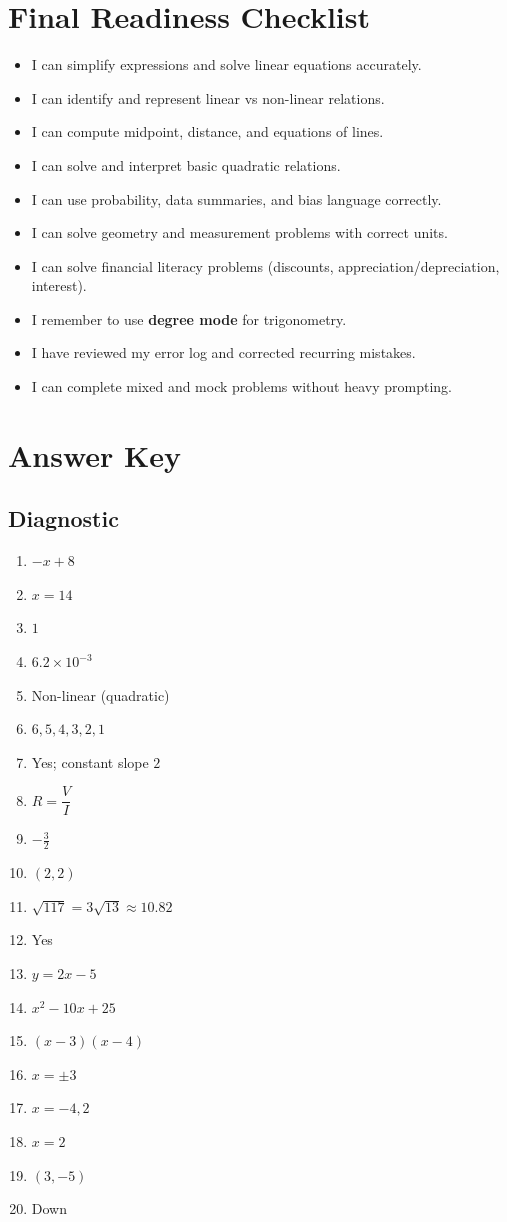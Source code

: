 \documentclass[12pt,oneside]{article}
\begin{document}
\section{Final Readiness Checklist}
\begin{itemize}
  \item I can simplify expressions and solve linear equations accurately.
  \item I can identify and represent linear vs non-linear relations.
  \item I can compute midpoint, distance, and equations of lines.
  \item I can solve and interpret basic quadratic relations.
  \item I can use probability, data summaries, and bias language correctly.
  \item I can solve geometry and measurement problems with correct units.
  \item I can solve financial literacy problems (discounts, appreciation/depreciation, interest).
  \item I remember to use \textbf{degree mode} for trigonometry.
  \item I have reviewed my error log and corrected recurring mistakes.
  \item I can complete mixed and mock problems without heavy prompting.
\end{itemize}

\newpage
\section*{Answer Key}

\subsection*{Diagnostic}
\begin{enumerate}
  \item $-x+8$
  \item $x=14$
  \item $1$
  \item $6.2\times10^{-3}$
  \item Non-linear (quadratic)
  \item $6,5,4,3,2,1$
  \item Yes; constant slope $2$
  \item $R=\dfrac{V}{I}$
  \item $-\frac{3}{2}$
  \item $(2,2)$
  \item $\sqrt{117}=3\sqrt{13}\approx10.82$
  \item Yes
  \item $y=2x-5$
  \item $x^2-10x+25$
  \item $(x-3)(x-4)$
  \item $x=\pm 3$
  \item $x=-4,2$
  \item $x=2$
  \item $(3,-5)$
  \item Down
\end{enumerate}
\end{document}
